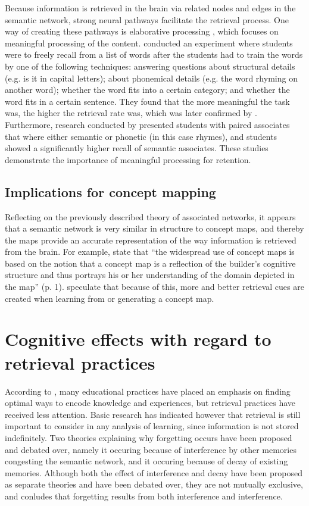 Because information is retrieved in the brain via related nodes and edges in the semantic network, strong neural pathways facilitate the retrieval process. One way of creating these pathways is elaborative processing \cite{karpicke4, cognitivepsychology}, which focuses on meaningful processing of the content.  conducted an experiment where students were to freely recall from a list of words after the students had to train the words by one of the following techniques: answering questions about structural details (e.g. is it in capital letters); about phonemical details (e.g. the word rhyming on another word); whether the word fits into a certain category; and whether the word fits in a certain sentence. They found that the more meaningful the task was, the higher the retrieval rate was, which was later confirmed by . Furthermore, research conducted by  presented students with paired associates that where either semantic or phonetic (in this case rhymes), and students showed a significantly higher recall of semantic associates. These studies demonstrate the importance of meaningful processing for retention.

\subsection{Implications for concept mapping}

Reflecting on the previously described theory of associated networks, it appears that a semantic network is very similar in structure to concept maps, and thereby the maps provide an accurate representation of the way information is retrieved from the brain. For example,  state that ``the widespread use of concept maps is based on the notion that a concept map is a reflection of the builder's cognitive structure and thus portrays his or her understanding of the domain depicted in the map'' (p. 1).  speculate that because of this, more and better retrieval cues are created when learning from or generating a concept map.

\section{Cognitive effects with regard to retrieval practices}

According to , many educational practices have placed an emphasis on finding optimal ways to encode knowledge and experiences, but retrieval practices have received less attention. Basic research has indicated however that retrieval is still important to consider in any analysis of learning, since information is not stored indefinitely. Two theories explaining why forgetting occurs have been proposed and debated over, namely it occuring because of interference by other memories congesting the semantic network, and it occuring because of decay of existing memories. Although both the effect of interference and decay have been proposed as separate theories and have been debated over, they are not mutually exclusive, and  conludes that forgetting results from both interference and interference.


